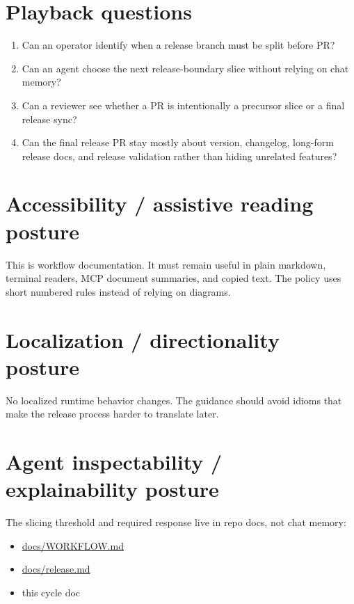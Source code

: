 \section{Playback questions}\label{record-205-playback-questions}

\begin{enumerate}
\def\labelenumi{\arabic{enumi}.}
\tightlist
\item
  Can an operator identify when a release branch must be split before PR?
\item
  Can an agent choose the next release-boundary slice without relying on chat memory?
\item
  Can a reviewer see whether a PR is intentionally a precursor slice or a final release sync?
\item
  Can the final release PR stay mostly about version, changelog, long-form release docs, and release validation rather than hiding unrelated features?
\end{enumerate}

\section{Accessibility / assistive reading posture}\label{record-205-accessibility-assistive-reading-posture}

This is workflow documentation. It must remain useful in plain markdown, terminal readers, MCP document summaries, and copied text. The policy uses short numbered rules instead of relying on diagrams.

\section{Localization / directionality posture}\label{record-205-localization-directionality-posture}

No localized runtime behavior changes. The guidance should avoid idioms that make the release process harder to translate later.

\section{Agent inspectability / explainability posture}\label{record-205-agent-inspectability-explainability-posture}

The slicing threshold and required response live in repo docs, not chat memory:

\begin{itemize}
\tightlist
\item
  \href{https://github.com/flyingrobots/bijou/blob/cbd70612140e7a450d764b3c7be1c6af878b99bc/docs/WORKFLOW.md}{docs/WORKFLOW.md}
\item
  \href{https://github.com/flyingrobots/bijou/blob/cbd70612140e7a450d764b3c7be1c6af878b99bc/docs/release.md}{docs/release.md}
\item
  this cycle doc
\end{itemize}

